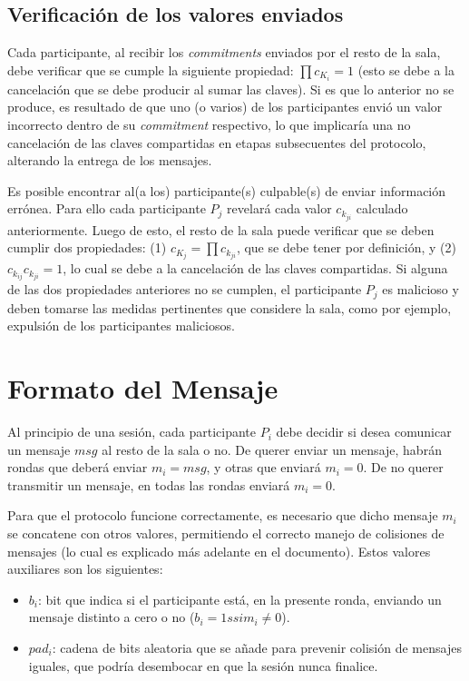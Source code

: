 \subsection{Verificación de los valores enviados}

Cada participante, al recibir los \emph{commitments} enviados por el resto de 
la sala, debe verificar que se cumple la siguiente propiedad: 
$\prod c_{K_i} = 1$ (esto se debe a la cancelación que se debe producir al 
sumar las claves). Si es que lo anterior no se produce, es resultado de que 
uno (o varios) de los participantes envió un valor incorrecto dentro de su 
\emph{commitment} respectivo, lo que implicaría una no cancelación de las 
claves compartidas en etapas subsecuentes del protocolo, alterando la entrega 
de los mensajes.

Es posible encontrar al(a los) participante(s) culpable(s) de enviar 
información errónea. Para ello cada participante $P_j$ revelará cada valor 
$c_{k_{ji}}$ calculado anteriormente. Luego de esto, el resto de la sala puede 
verificar que se deben cumplir dos propiedades: 
(1) $c_{K_j} = \prod c_{k_{ji}}$, que se debe tener por definición, y 
(2) $c_{k_{ij}} c_{k_{ji}} = 1$, lo cual se debe a la cancelación de las 
claves compartidas. Si alguna de las dos propiedades anteriores no se cumplen, 
el participante $P_j$ es malicioso y deben tomarse las medidas pertinentes que 
considere la sala, como por ejemplo, expulsión de los participantes maliciosos.

\section{Formato del Mensaje}

Al principio de una sesión, cada participante $P_i$ debe decidir si desea 
comunicar un mensaje $msg$ al resto de la sala o no. De querer enviar un 
mensaje, habrán rondas que deberá enviar $m_i = msg$, y otras que enviará 
$m_i = 0$. De no querer transmitir un mensaje, en todas las rondas enviará 
$m_i = 0$. 

Para que el protocolo funcione correctamente, es necesario que dicho mensaje 
$m_i$ se concatene con otros valores, permitiendo el correcto manejo de 
colisiones de mensajes (lo cual es explicado más adelante en el documento). 
Estos valores auxiliares son los siguientes:
\begin{itemize}
    \item $b_i$: bit que indica si el participante está, en la presente ronda, 
    enviando un mensaje distinto a cero o no ($b_i = 1 ssi m_i \neq 0$).
    \item $pad_i$: cadena de bits aleatoria que se añade para prevenir 
    colisión de mensajes iguales, que podría desembocar en que la sesión nunca 
    finalice.
\end{itemize}

